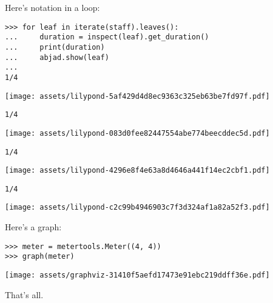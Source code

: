 \documentclass{article}
\begin{document}
Here's notation in a loop:

\begin{comment}
<abjad>
for leaf in iterate(staff).leaves():
    duration = inspect(leaf).get_duration()
    print(duration)
    abjad.show(leaf)

</abjad>
\end{comment}

\begin{singlespacing}
\begin{lstlisting}
>>> for leaf in iterate(staff).leaves():
...     duration = inspect(leaf).get_duration()
...     print(duration)
...     abjad.show(leaf)
...
1/4
\end{lstlisting}
\noindent\texttt{[image: assets/lilypond-5af429d4d8ec9363c325eb63be7fd97f.pdf]}
\begin{lstlisting}
1/4
\end{lstlisting}
\noindent\texttt{[image: assets/lilypond-083d0fee82447554abe774beecddec5d.pdf]}
\begin{lstlisting}
1/4
\end{lstlisting}
\noindent\texttt{[image: assets/lilypond-4296e8f4e63a8d4646a441f14ec2cbf1.pdf]}
\begin{lstlisting}
1/4
\end{lstlisting}
\noindent\texttt{[image: assets/lilypond-c2c99b4946903c7f3d324af1a82a52f3.pdf]}
\end{singlespacing}

Here's a graph:

\begin{comment}
<abjad>
meter = metertools.Meter((4, 4))
graph(meter)
</abjad>
\end{comment}

\begin{singlespacing}
\begin{lstlisting}
>>> meter = metertools.Meter((4, 4))
>>> graph(meter)
\end{lstlisting}
\noindent\texttt{[image: assets/graphviz-31410f5aefd17473e91ebc219ddff36e.pdf]}
\end{singlespacing}

That's all.
\end{document}
